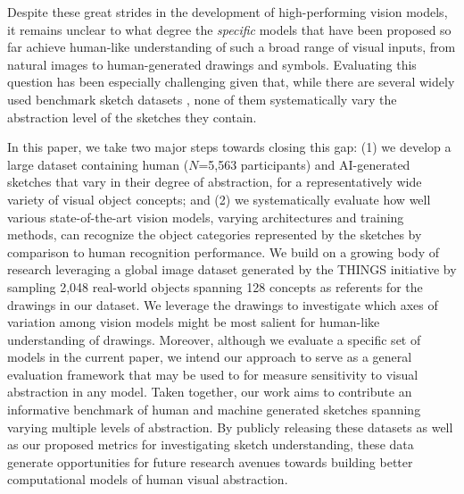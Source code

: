 \documentclass[10pt,letterpaper]{article}
\begin{document}
Despite these great strides in the development of high-performing vision models, it remains unclear to what degree the \textit{specific} models that have been proposed so far achieve human-like understanding of such a broad range of visual inputs, from natural images to human-generated drawings and symbols.
Evaluating this question has been especially challenging given that, while there are several widely used benchmark sketch datasets \cite{eitz2012sketch, jongejan2017quick, sangkloy2016sketchy}, none of them systematically vary the abstraction level of the sketches they contain. 

In this paper, we take two major steps towards closing this gap: 
(1) we develop a large dataset containing human ($N$=5,563 participants) and AI-generated sketches that vary in their degree of abstraction, for a representatively wide variety of visual object concepts; 
and (2) we systematically evaluate how well various state-of-the-art vision models, varying architectures and training methods, can recognize the object categories represented by the sketches by comparison to human recognition performance. 
We build on a growing body of research leveraging a global image dataset generated by the THINGS initiative \cite{hebart2019things} by sampling 2,048 real-world objects spanning 128 concepts as referents for the drawings in our dataset.
We leverage the drawings to investigate which axes of variation among vision models might be most salient for human-like understanding of drawings.
Moreover, although we evaluate a specific set of models in the current paper, we intend our approach to serve as a general evaluation framework that may be used to for measure sensitivity to visual abstraction in any model.
Taken together, our work aims to contribute an informative benchmark of human and machine generated sketches spanning varying multiple levels of abstraction. 
By publicly releasing these datasets as well as our proposed metrics for investigating sketch understanding, these data generate opportunities for future research avenues towards building better computational models of human visual abstraction.
\end{document}
